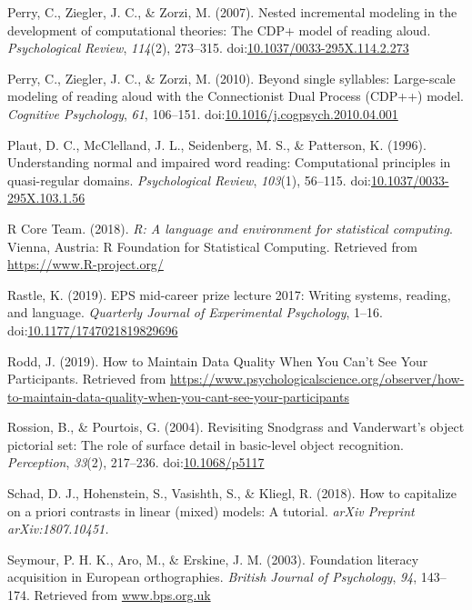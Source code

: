 \documentclass[doc,floatsintext]{apa6}
\begin{document}
\hypertarget{ref-Perry2007}{}
Perry, C., Ziegler, J. C., \& Zorzi, M. (2007). Nested incremental
modeling in the development of computational theories: The CDP+ model of
reading aloud. \emph{Psychological Review}, \emph{114}(2), 273--315.
doi:\href{https://doi.org/10.1037/0033-295X.114.2.273}{10.1037/0033-295X.114.2.273}

\hypertarget{ref-Perry2010}{}
Perry, C., Ziegler, J. C., \& Zorzi, M. (2010). Beyond single syllables:
Large-scale modeling of reading aloud with the Connectionist Dual
Process (CDP++) model. \emph{Cognitive Psychology}, \emph{61}, 106--151.
doi:\href{https://doi.org/10.1016/j.cogpsych.2010.04.001}{10.1016/j.cogpsych.2010.04.001}

\hypertarget{ref-Plaut1996}{}
Plaut, D. C., McClelland, J. L., Seidenberg, M. S., \& Patterson, K.
(1996). Understanding normal and impaired word reading: Computational
principles in quasi-regular domains. \emph{Psychological Review},
\emph{103}(1), 56--115.
doi:\href{https://doi.org/10.1037/0033-295X.103.1.56}{10.1037/0033-295X.103.1.56}

\hypertarget{ref-R-base}{}
R Core Team. (2018). \emph{R: A language and environment for statistical
computing}. Vienna, Austria: R Foundation for Statistical Computing.
Retrieved from \url{https://www.R-project.org/}

\hypertarget{ref-Rastle2019}{}
Rastle, K. (2019). EPS mid-career prize lecture 2017: Writing systems,
reading, and language. \emph{Quarterly Journal of Experimental
Psychology}, 1--16.
doi:\href{https://doi.org/10.1177/1747021819829696}{10.1177/1747021819829696}

\hypertarget{ref-Rodd2019}{}
Rodd, J. (2019). How to Maintain Data Quality When You Can't See Your
Participants. Retrieved from
\url{https://www.psychologicalscience.org/observer/how-to-maintain-data-quality-when-you-cant-see-your-participants}

\hypertarget{ref-Rossion2004}{}
Rossion, B., \& Pourtois, G. (2004). Revisiting Snodgrass and
Vanderwart's object pictorial set: The role of surface detail in
basic-level object recognition. \emph{Perception}, \emph{33}(2),
217--236. doi:\href{https://doi.org/10.1068/p5117}{10.1068/p5117}

\hypertarget{ref-Schad2018}{}
Schad, D. J., Hohenstein, S., Vasishth, S., \& Kliegl, R. (2018). How to
capitalize on a priori contrasts in linear (mixed) models: A tutorial.
\emph{arXiv Preprint arXiv:1807.10451.}

\hypertarget{ref-KSeymour2003}{}
Seymour, P. H. K., Aro, M., \& Erskine, J. M. (2003). Foundation
literacy acquisition in European orthographies. \emph{British Journal of
Psychology}, \emph{94}, 143--174. Retrieved from \url{www.bps.org.uk}
\end{document}
